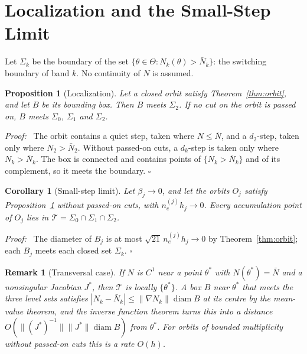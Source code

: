 \documentclass[letterpaper, 10 pt, conference]{ieeeconf}
\newtheorem{proposition}{Proposition}
\newtheorem{corollary}{Corollary}
\newtheorem{remark}{Remark}
\renewenvironment{proof}{\noindent\textit{Proof:}\ }{\hfill$\square$\par\smallskip}
\newcommand{\Nbar}{\bar{N}}
\begin{document}
\section{Localization and the Small-Step Limit}
\label{sec:limit}

Let $\Sigma_k$ be the boundary of the set
$\{\theta \in \Theta : N_k(\theta) > \Nbar_k\}$: the switching boundary of
band $k$. No continuity of $N$ is assumed.

\begin{proposition}[Localization]\label{prop:local}
Let a closed orbit satisfy Theorem~\ref{thm:orbit}, and let $B$ be its
bounding box. Then $B$ meets $\Sigma_2$. If no cut on the orbit is passed
on, $B$ meets $\Sigma_0$, $\Sigma_1$ and $\Sigma_2$.
\end{proposition}

\begin{proof}
The orbit contains a quiet step, taken where $N \le \Nbar$, and a $d_2$-step,
taken only where $N_2 > \Nbar_2$. Without passed-on cuts, a $d_k$-step is
taken only where $N_k > \Nbar_k$. The box is connected and contains points of
$\{N_k > \Nbar_k\}$ and of its complement, so it meets the boundary.
\end{proof}

\begin{corollary}[Small-step limit]\label{cor:limit}
Let $\beta_j \to 0$, and let the orbits $O_j$ satisfy
Proposition~\ref{prop:local} without passed-on cuts, with
$n_e^{(j)} h_j \to 0$. Every accumulation point of $O_j$ lies in
$\mathcal{T} = \Sigma_0 \cap \Sigma_1 \cap \Sigma_2$.
\end{corollary}

\begin{proof}
The diameter of $B_j$ is at most $\sqrt{21}\, n_e^{(j)} h_j \to 0$ by
Theorem~\ref{thm:orbit}; each $B_j$ meets each closed set $\Sigma_k$.
\end{proof}

\begin{remark}[Transversal case]\label{rem:transversal}
If $N$ is $C^1$ near a point $\theta^*$ with $N(\theta^*) = \Nbar$ and a
nonsingular Jacobian $J^*$, then $\mathcal{T}$ is locally $\{\theta^*\}$. A box
$B$ near $\theta^*$ that meets the three level sets satisfies
$|N_k - \Nbar_k| \le \lVert \nabla N_k \rVert \operatorname{diam} B$ at its
centre by the mean-value theorem, and the inverse function theorem turns this
into a distance $O(\lVert (J^*)^{-1} \rVert \lVert J^* \rVert
\operatorname{diam} B)$ from $\theta^*$. For orbits of bounded multiplicity
without passed-on cuts this is a rate $O(h)$.
\end{remark}
\end{document}
